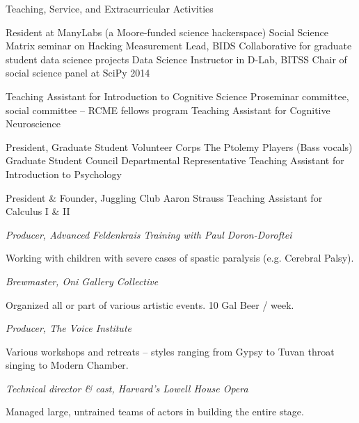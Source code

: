 \begin{rubric}{Teaching, Service, and Extracurricular Activities}

\entry*[2015] Resident at ManyLabs (a Moore-funded science hackerspace)
\entry*[2015] Social Science Matrix seminar on Hacking Measurement
\entry*[2015] Lead, BIDS Collaborative for graduate student data science projects
\entry*[2013--2015] Data Science Instructor in D-Lab, BITSS
\entry*[2014] Chair of social science panel at SciPy 2014

\entry*[2012] Teaching Assistant for Introduction to Cognitive Science
\entry*[2010--2012] Proseminar committee, social committee -- RCME fellows program
\entry*[2007] Teaching Assistant for Cognitive Neuroscience

\entry*[2001--2002] President, Graduate Student Volunteer Corps
\entry*[2001--2002] The Ptolemy Players (Bass vocals)
\entry*[2001] Graduate Student Council Departmental Representative
\entry*[2000] Teaching Assistant for Introduction to Psychology

\entry*[1996--1999] President \& Founder, Juggling Club
\entry*[1996--1997] Aaron Strauss Teaching Assistant for Calculus I \& II

\entry*[2004] \emph{Producer, Advanced Feldenkrais Training with Paul Doron-Doroftei}
\par Working with children with severe cases of spastic paralysis (e.g. Cerebral
Palsy).

\entry*[2003] \emph{Brewmaster, Oni Gallery Collective}
\par Organized all or part of various artistic events.  10 Gal Beer / week.

\entry*[2001-2003] \emph{Producer, The Voice Institute}
\par Various workshops and retreats -- styles ranging from Gypsy to Tuvan throat
singing to Modern Chamber.

\entry*[2003] \emph{Technical director \& cast, Harvard's Lowell House Opera}
\par Managed large, untrained teams of actors in building the entire stage.


\end{rubric}
